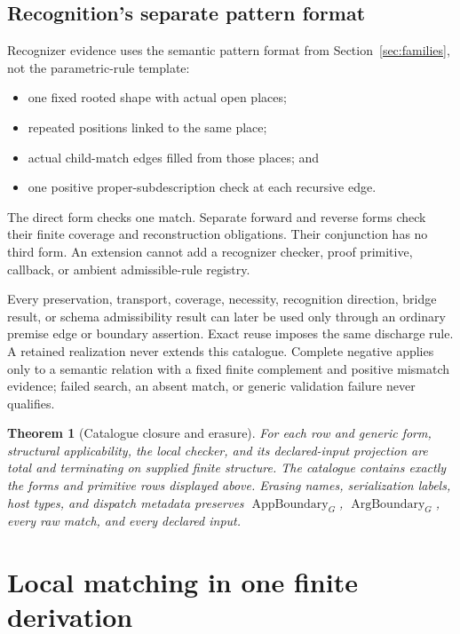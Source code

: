 \documentclass[11pt,twoside]{article}
\newtheorem{theorem}{Theorem}
\begin{document}
\subsection{Recognition's separate pattern format}

Recognizer evidence uses the semantic pattern format from
Section~\ref{sec:families}, not the parametric-rule template:

\begin{itemize}[leftmargin=2em]
  \item one fixed rooted shape with actual open places;
  \item repeated positions linked to the same place;
  \item actual child-match edges filled from those places; and
  \item one positive proper-subdescription check at each recursive edge.
\end{itemize}

The direct form checks one match.  Separate forward and reverse forms check their
finite coverage and reconstruction obligations.  Their conjunction has no third
form.  An extension cannot add a recognizer checker, proof primitive, callback, or
ambient admissible-rule registry.

Every preservation, transport, coverage, necessity, recognition direction, bridge
result, or schema admissibility result can later be used only through an ordinary
premise edge or boundary assertion.  Exact reuse imposes the same discharge rule.
A retained realization never extends this catalogue.  Complete negative applies
only to a semantic relation with a fixed finite complement and positive mismatch
evidence; failed search, an absent match, or generic validation failure never
qualifies.

\begin{theorem}[Catalogue closure and erasure]\label{thm:catalogue}
For each row and generic form, structural applicability, the local checker, and its
declared-input projection are total and terminating on supplied finite structure.
The catalogue contains exactly the forms and primitive rows displayed above.
Erasing names, serialization labels, host types, and dispatch metadata preserves
\(\operatorname{AppBoundary}_G\), \(\operatorname{ArgBoundary}_G\), every raw
match, and every declared input.
\end{theorem}

\section{Local matching in one finite derivation}\label{sec:local-match}
\end{document}
